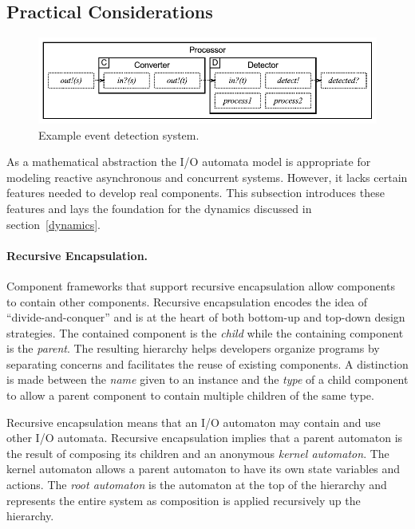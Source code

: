 \subsection{Practical Considerations\label{practical}}

\begin{figure}
\center
\includegraphics[width=\textwidth]{system_model}
\caption{Example event detection system.}
\label{sys_model}
\end{figure}

As a mathematical abstraction the I/O automata model is appropriate for modeling reactive asynchronous and concurrent systems.
However, it lacks certain features needed to develop real components.
This subsection introduces these features and lays the foundation for the dynamics discussed in section~\ref{dynamics}.

\paragraph{Recursive Encapsulation.}
Component frameworks that support recursive encapsulation allow components to contain other components.
Recursive encapsulation encodes the idea of ``divide-and-conquer'' and is at the heart of both bottom-up and top-down design strategies.
The contained component is the \emph{child} while the containing component is the \emph{parent}.
The resulting hierarchy helps developers organize programs by separating concerns and facilitates the reuse of existing components.
A distinction is made between the \emph{name} given to an instance and the \emph{type} of a child component to allow a parent component to contain multiple children of the same type.

Recursive encapsulation means that an I/O automaton may contain and use other I/O automata.
Recursive encapsulation implies that a parent automaton is the result of composing its children and an anonymous \emph{kernel automaton}.
The kernel automaton allows a parent automaton to have its own state variables and actions.
The \emph{root automaton} is the automaton at the top of the hierarchy and represents the entire system as composition is applied recursively up the hierarchy.

